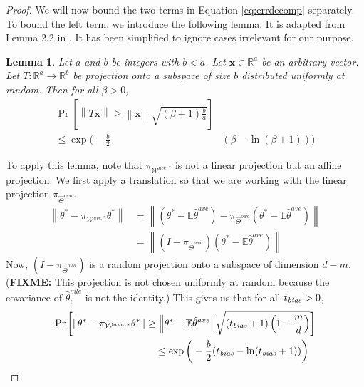 \documentclass[twoside]{article}
\newtheorem{lemma}{Lemma}
\newcommand{\W}{{\hat \Theta^{\textit{owa}}}}
\newcommand{\Wtave}{{\mathcal{W}^{ave,*}}}
\newcommand{\E}{\mathbb{E}}
\newcommand{\x}{\mathbf{x}}
\newcommand{\w}{\theta}
\newcommand{\wtave}{\E\hat\w^{ave}}
\newcommand{\wmle}{\hat\w^{mle}}
\newcommand{\wstar}{{\w^{*}}}
\newcommand{\tbias}{t_{\text{\textit{bias}}}}
\newcommand{\ltwo}[1]{{\left\lVert {#1} \right\rVert}}
\newcommand{\proj}[1]{\pi_{{#1}}}
\newcommand{\prob}[1]{\Pr\left[{#1}\right]}
\newcommand{\fixme}[1]{\textbf{FIXME:} {#1}}
\begin{document}
\begin{proof}
{%

We will now bound the two terms in Equation \ref{eq:errdecomp} separately.
To bound the left term, we introduce the following lemma.
It is adapted from Lemma 2.2 in \cite{dasgupta2003elementary}.
It has been simplified to ignore cases irrelevant for our purpose.
\begin{lemma}
Let $a$ and $b$ be integers with $b<a$.
Let $\x\in\mathbb{R}^a$ be an arbitrary vector.
Let $T : \mathbb{R}^a \to \mathbb{R}^b$ be projection onto a subspace of size $b$ distributed uniformly at random.
Then for all $\beta>0$,
\begin{equation}
\begin{split}
\prob{\ltwo{T\x} \ge \ltwo\x\sqrt{(\beta + 1)\frac{b}{a}}}&
\\
\le
\exp \bigg(-\frac{b}{2} & (\beta-\ln(\beta+1))\bigg)
\end{split}
\end{equation}
\end{lemma}
To apply this lemma, note that $\proj\Wtave$ is not a linear projection but an affine projection.
We first apply a translation so that we are working with the linear projection $\proj\W$.
\begin{align}
\ltwo{\wstar-\proj\Wtave\wstar}
&=
\ltwo{(\wstar-\wtave)-\proj\W(\wstar-\wtave)}
\\
&=
\ltwo{(I-\proj\W)(\wstar-\wtave)}
\end{align}
Now, $(I-\proj\W)$ is a random projection onto a subspace of dimension $d-m$.
(\fixme{This projection is not chosen uniformly at random because the covariance of $\wmle_i$ is not the identity.})
This gives us that for all $\tbias>0$,
\begin{equation}
\begin{split}
\prob{\ltwo{\wstar-\proj\Wtave\wstar} \ge \ltwo{\wstar-\wtave}\sqrt{(\tbias + 1)\left(1-\frac{m}{d}\right)}}&
\\
\le
\exp \bigg(-\frac{b}{2} (\tbias-\ln(\tbias+1))\bigg)~~&
\end{split}
\end{equation}
}

\end{proof}
\end{document}
